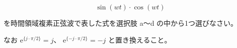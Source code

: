 \[
\sin (wt) \cdot \cos (wt)
\]

\bigskip
\noindent を時間領域複素正弦波で表した式を選択肢 a〜d の中から1つ選びなさい。

\noindent なお $\textrm{e}^{\{ j \cdot \pi/2 \}} = j$、 $\textrm{e}^{\{ -j \cdot \pi/2 \}} = -j$ と置き換えること。
